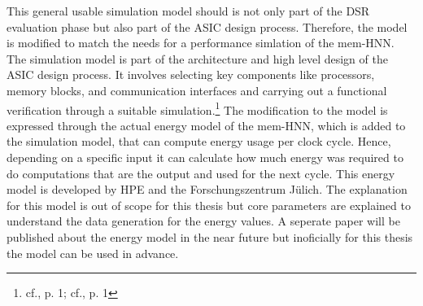 This general usable simulation model should is not only part of the \ac{DSR} evaluation phase but also part of the \ac{ASIC} design process. 
Therefore, the model is modified to match the needs for a performance simlation of the \ac{mem-HNN}.
The simulation model is part of the architecture and high level design of the \ac{ASIC} design process.
It involves selecting key components like processors, memory blocks, and communication interfaces and carrying out a functional verification through a suitable simulation.\footnote{cf.\cite{raoUltimateGuideASIC}, p. 1; cf.\cite{ASICDesignFlow}, p. 1}
The modification to the model is expressed through the actual energy model of the \ac{mem-HNN}, which is added to the simulation model, that can compute energy usage per clock cycle. 
Hence, depending on a specific input it can calculate how much energy was required to do computations that are the output and used for the next cycle. 
This energy model is developed by HPE and the Forschungszentrum Jülich.
The explanation for this model is out of scope for this thesis but core parameters are explained to understand the data generation for the energy values.
A seperate paper will be published about the energy model in the near future but inoficially for this thesis the model can be used in advance.

